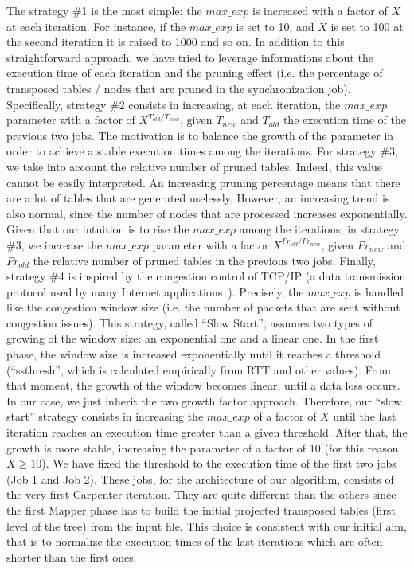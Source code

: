 The strategy \#1 is the most simple: the $max\_exp$ is increased with a factor of $X$ at each iteration. For instance, if the $max\_exp$ is set to 10, and $X$ is set to 100 at the second iteration it is raised to 1000 and so on.
In addition to this straightforward approach, we have tried to leverage informations about the execution time of each iteration and the pruning effect (i.e. the percentage of transposed tables / nodes that are pruned in the synchronization job). 
Specifically, strategy \#2 consists in increasing, at each iteration, the $max\_exp$ parameter with a factor of  $X^{T_{old} / T_{new}}$, given $T_{new}$ and  $T_{old}$ the execution time of the previous two jobs. The motivation is to balance the growth of the parameter in order to achieve a stable execution times among the iterations.  
For strategy \#3, we take into account the relative number of pruned tables. Indeed, this value cannot be easily interpreted. An increasing pruning percentage means that there are a lot of tables that are generated uselessly. However, an increasing trend is also normal, since the number of nodes that are processed increases exponentially. Given that our intuition is to rise the  $max\_exp$ among the iterations, in strategy \#3, we increase the $max\_exp$ parameter with a factor $X^{Pr_{old} / Pr_{new}}$, given $Pr_{new}$ and  $Pr_{old}$ the relative number of pruned tables in the previous two jobs. 
Finally, strategy \#4 is inspired by the congestion control of TCP/IP (a data transmission protocol used by many Internet applications~\cite{Jacobson:1988:CAC:52325.52356}). Precisely, the $max\_exp$ is handled like the congestion window size (i.e. the number of packets that are sent without congestion issues).
This strategy, called ``Slow Start'', assumes two types of growing of the window size: an exponential one and a linear one. In the first phase, the window size is increased exponentially until it reaches a threshold (``ssthresh'', which is calculated empirically from RTT and other values). From that moment, the growth of the window becomes linear, until a data loss occurs.
In our case, we just inherit the two growth factor approach. Therefore, our ``slow start'' strategy consists in increasing the $max\_exp$ of a factor of $X$ until the last iteration reaches an execution time greater than a given threshold. After that, the growth is more stable, increasing the parameter of a factor of 10 (for this reason $X\geq10$).
We have fixed the threshold to the execution time of the first two jobs (Job 1 and Job 2). These jobs, for the architecture of our algorithm, consists of the very first Carpenter iteration. They are quite different than the others since the first Mapper phase has to build the initial projected transposed tables (first level of the tree) from the input file. This choice is consistent with our initial aim, that is to normalize the execution times of the last iterations which are often shorter than the first ones.

